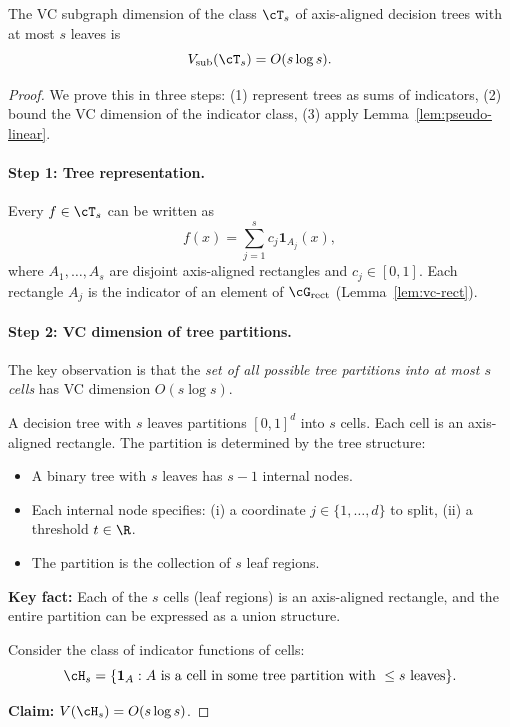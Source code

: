 \begin{theorem}
\label{thm:vc-trees}
The VC subgraph dimension of the class $\cT_s$ of axis-aligned decision trees with at most $s$ leaves is
\[
V_{\text{sub}}(\cT_s) = O(s \log s).
\]
\end{theorem}

\begin{proof}
We prove this in three steps: (1) represent trees as sums of indicators, (2) bound the VC dimension of the indicator class, (3) apply Lemma~\ref{lem:pseudo-linear}.

\paragraph{Step 1: Tree representation.}
Every $f \in \cT_s$ can be written as
\[
f(x) = \sum_{j=1}^s c_j \mathbf{1}_{A_j}(x),
\]
where $A_1, \ldots, A_s$ are disjoint axis-aligned rectangles and $c_j \in [0,1]$. Each rectangle $A_j$ is the indicator of an element of $\cG_{\text{rect}}$ (Lemma~\ref{lem:vc-rect}).

\paragraph{Step 2: VC dimension of tree partitions.}
The key observation is that the \emph{set of all possible tree partitions into at most $s$ cells} has VC dimension $O(s \log s)$.

A decision tree with $s$ leaves partitions $[0,1]^d$ into $s$ cells. Each cell is an axis-aligned rectangle. The partition is determined by the tree structure:
\begin{itemize}
\item A binary tree with $s$ leaves has $s-1$ internal nodes.
\item Each internal node specifies: (i) a coordinate $j \in \{1,\ldots,d\}$ to split, (ii) a threshold $t \in \R$.
\item The partition is the collection of $s$ leaf regions.
\end{itemize}

\textbf{Key fact:} Each of the $s$ cells (leaf regions) is an axis-aligned rectangle, and the entire partition can be expressed as a union structure.

Consider the class of indicator functions of cells:
\[
\cH_s = \{ \mathbf{1}_{A} : A \text{ is a cell in some tree partition with } \le s \text{ leaves} \}.
\]

\textbf{Claim:} $V(\cH_s) = O(s \log s)$.


\end{proof}
